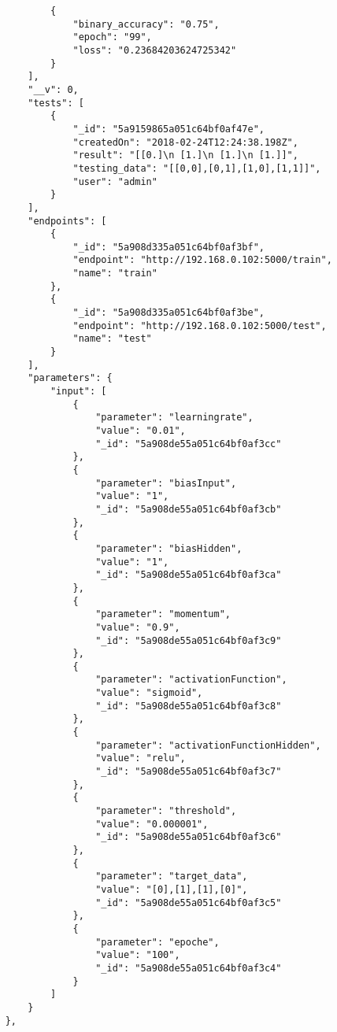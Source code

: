 \begin{lstlisting}
            {
                "binary_accuracy": "0.75",
                "epoch": "99",
                "loss": "0.23684203624725342"
            }
        ],
        "__v": 0,
        "tests": [
            {
                "_id": "5a9159865a051c64bf0af47e",
                "createdOn": "2018-02-24T12:24:38.198Z",
                "result": "[[0.]\n [1.]\n [1.]\n [1.]]",
                "testing_data": "[[0,0],[0,1],[1,0],[1,1]]",
                "user": "admin"
            }
        ],
        "endpoints": [
            {
                "_id": "5a908d335a051c64bf0af3bf",
                "endpoint": "http://192.168.0.102:5000/train",
                "name": "train"
            },
            {
                "_id": "5a908d335a051c64bf0af3be",
                "endpoint": "http://192.168.0.102:5000/test",
                "name": "test"
            }
        ],
        "parameters": {
            "input": [
                {
                    "parameter": "learningrate",
                    "value": "0.01",
                    "_id": "5a908de55a051c64bf0af3cc"
                },
                {
                    "parameter": "biasInput",
                    "value": "1",
                    "_id": "5a908de55a051c64bf0af3cb"
                },
                {
                    "parameter": "biasHidden",
                    "value": "1",
                    "_id": "5a908de55a051c64bf0af3ca"
                },
                {
                    "parameter": "momentum",
                    "value": "0.9",
                    "_id": "5a908de55a051c64bf0af3c9"
                },
                {
                    "parameter": "activationFunction",
                    "value": "sigmoid",
                    "_id": "5a908de55a051c64bf0af3c8"
                },
                {
                    "parameter": "activationFunctionHidden",
                    "value": "relu",
                    "_id": "5a908de55a051c64bf0af3c7"
                },
                {
                    "parameter": "threshold",
                    "value": "0.000001",
                    "_id": "5a908de55a051c64bf0af3c6"
                },
                {
                    "parameter": "target_data",
                    "value": "[0],[1],[1],[0]",
                    "_id": "5a908de55a051c64bf0af3c5"
                },
                {
                    "parameter": "epoche",
                    "value": "100",
                    "_id": "5a908de55a051c64bf0af3c4"
                }
            ]
        }
    },
    
\end{lstlisting}


    
